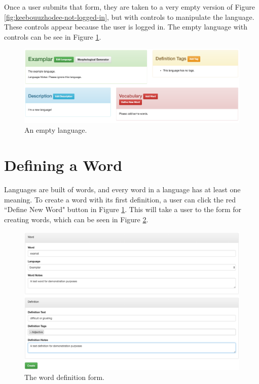 Once a user submits that form, they are taken to a very empty version of Figure \ref{fig:keebouuzhodee-not-logged-in}, but with controls to manipulate the language. These controls appear because the user is logged in. The empty language with controls can be see in Figure \ref{fig:empty-language-logged-in}.

\begin{figure}[h]
\includegraphics[width=\textwidth]{figures/empty-language-logged-in}
\caption{An empty language.}
\centering
\label{fig:empty-language-logged-in}
\end{figure}

\section{Defining a Word}
\label{sec:define-word}

Languages are built of words, and every word in a language has at least one meaning. To create a word with its first definition, a user can click the red ``Define New Word" button in Figure \ref{fig:empty-language-logged-in}. This will take a user to the form for creating words, which can be seen in Figure \ref{fig:define-word}.

\begin{figure}[h]
\includegraphics[width=\textwidth]{figures/define-word-filled-in}
\caption{The word definition form.}
\centering
\label{fig:define-word}
\end{figure}


